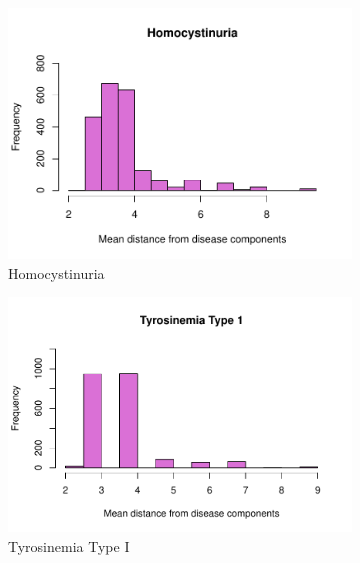 \begin{figure}[h!]
\begin{subfigure}[b]{0.3\textwidth}
         \includegraphics[scale=0.25]{Images/Homocystinuria.pdf}
         \caption{Homocystinuria}
         \label{fig:Homocystinuria}
     \end{subfigure}
     \hfill
     \begin{subfigure}[b]{0.3\textwidth}
         \centering
         \includegraphics[scale=0.25]{Images/Tyrosinemia Type I.pdf}
         \caption{Tyrosinemia Type I}
         \label{fig:Tyrosinemia Type I}
     \end{subfigure}
     \hfill
     \begin{subfigure}[b]{0.3\textwidth}
         \centering

\end{subfigure}
\end{figure}
